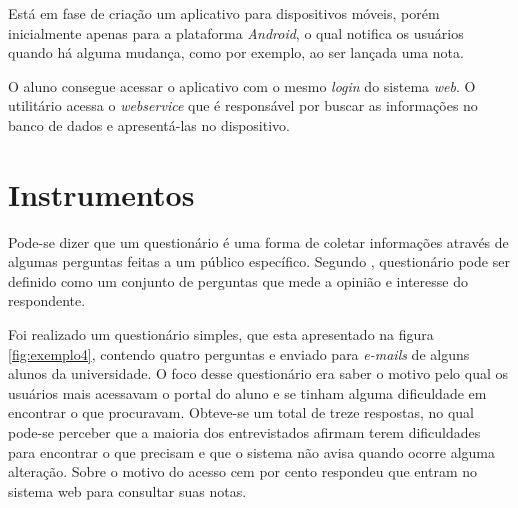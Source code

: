 	\par Está em fase de criação um aplicativo para dispositivos móveis, porém
inicialmente apenas para a plataforma \textit{Android}, o qual notifica os
usuários quando há alguma mudança, como por exemplo, ao ser lançada uma nota.
	
	\par O aluno consegue acessar o aplicativo com o mesmo \textit{login} do
sistema \textit{web}. O utilitário acessa o \textit{webservice} que é
responsável por buscar as informações no banco de dados e apresentá-las no
dispositivo.
	
\section{Instrumentos}

	\par Pode-se dizer que um questionário é uma forma de coletar informações
através de algumas perguntas feitas a um público específico. Segundo
, questionário pode ser definido como um conjunto
de perguntas que mede a opinião e interesse do respondente.
	
	\par Foi realizado um questionário simples, que esta apresentado na figura
\ref{fig:exemplo4}, contendo quatro perguntas e enviado para \textit{e-mails} de
alguns alunos da universidade. O foco desse questionário era saber o motivo pelo qual
os usuários mais acessavam o portal do aluno e se tinham alguma dificuldade em
encontrar o que procuravam. Obteve-se um total de treze respostas, no qual
pode-se perceber que a maioria dos entrevistados afirmam terem dificuldades
para encontrar o que precisam e que o sistema não avisa quando ocorre alguma
alteração. Sobre o motivo do acesso cem por cento respondeu que entram no
sistema web para consultar suas notas.

